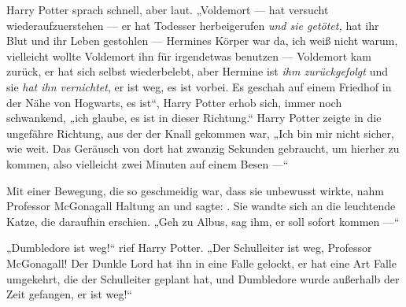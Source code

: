 Harry Potter sprach schnell, aber laut.
„Voldemort — hat versucht wiederaufzuerstehen — er hat Todesser herbeigerufen \emph{und sie getötet,} hat ihr Blut und ihr Leben gestohlen — Hermines Körper war da, ich weiß nicht warum, vielleicht wollte Voldemort ihn für irgendetwas benutzen — Voldemort kam zurück, er hat sich selbst wiederbelebt, aber Hermine ist \emph{ihm zurückgefolgt} und sie \emph{hat ihn vernichtet}, er ist weg, es ist vorbei. Es geschah auf einem Friedhof in der Nähe von Hogwarts, es ist“, Harry Potter erhob sich, immer noch schwankend, „ich glaube, es ist in dieser Richtung.“
Harry Potter zeigte in die ungefähre Richtung, aus der der Knall gekommen war,
„Ich bin mir nicht sicher, wie weit. Das Geräusch von dort hat zwanzig Sekunden gebraucht, um hierher zu kommen, also vielleicht zwei Minuten auf einem Besen —“

Mit einer Bewegung, die so geschmeidig war, dass sie unbewusst wirkte, nahm Professor McGonagall Haltung an und sagte: . Sie wandte sich an die leuchtende Katze, die daraufhin erschien.
„Geh zu Albus, sag ihm, er soll sofort kommen —“

„Dumbledore ist weg!“ rief Harry Potter.
„Der Schulleiter ist weg, Professor McGonagall! Der Dunkle Lord hat ihn in eine Falle gelockt, er hat eine Art Falle umgekehrt, die der Schulleiter geplant hat, und Dumbledore wurde außerhalb der Zeit gefangen, er ist weg!“

